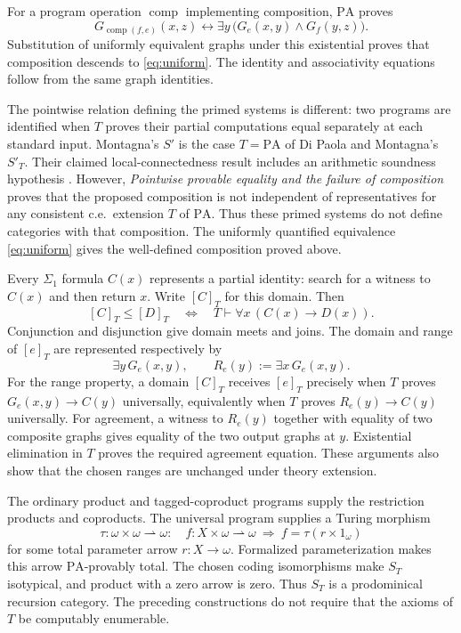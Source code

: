 \documentclass[11pt]{article}
\newcommand{\PA}{\mathrm{PA}}
\begin{document}
For a program operation $\operatorname{comp}$ implementing composition,
$\PA$ proves
\begin{equation}\label{eq:composition}
 G_{\operatorname{comp}(f,e)}(x,z)
 \leftrightarrow
 \exists y\,\bigl(G_e(x,y)\land G_f(y,z)\bigr).
\end{equation}
Substitution of uniformly equivalent graphs under this existential proves
that composition descends to \eqref{eq:uniform}. The identity and
associativity equations follow from the same graph identities.

The pointwise relation defining the primed systems is different:
two programs are identified when $T$ proves their partial computations
equal separately at each standard input. Montagna's $S'$ is the case
$T=\PA$ of Di Paola and Montagna's $S'_T$. Their claimed
local-connectedness result includes an arithmetic soundness hypothesis
\cite[Theorem 4.5, pp.~658--659]{DPM}. However,
\emph{Pointwise provable equality and the failure of composition}
\cite[Corollary 2]{Composition} proves that the proposed composition
is not independent of representatives for any consistent c.e.\
extension $T$ of $\PA$. Thus these primed systems do not define
categories with that composition. The uniformly quantified equivalence
\eqref{eq:uniform} gives the well-defined composition proved above.

Every $\Sigma_1$ formula $C(x)$ represents a partial identity: search for
a witness to $C(x)$ and then return $x$. Write $[C]_T$ for this domain.
Then
\begin{equation}\label{eq:domain-order}
 [C]_T\le[D]_T
 \quad\Longleftrightarrow\quad
 T\vdash\forall x\,(C(x)\longrightarrow D(x)).
\end{equation}
Conjunction and disjunction give domain meets and joins. The domain and
range of $[e]_T$ are represented respectively by
\[
 \exists y\,G_e(x,y),\qquad
 R_e(y):=\exists x\,G_e(x,y).
\]
For the range property, a domain $[C]_T$ receives $[e]_T$ precisely when
$T$ proves $G_e(x,y)\to C(y)$ universally, equivalently when
$T$ proves $R_e(y)\to C(y)$ universally. For agreement, a witness to
$R_e(y)$ together with equality of two composite graphs gives equality
of the two output graphs at $y$. Existential elimination in $T$ proves
the required agreement equation. These arguments also show that the
chosen ranges are unchanged under theory extension.

The ordinary product and tagged-coproduct programs supply the restriction
products and coproducts. The universal program supplies a Turing morphism
\[
 \tau:\omega\times\omega\rightharpoonup\omega:
 \quad f:X\times\omega\rightharpoonup\omega
 \ \Longrightarrow\ 
 f=\tau(r\times1_\omega)
\]
for some total parameter arrow $r:X\to\omega$. Formalized
parameterization makes this arrow $\PA$-provably total. The chosen coding
isomorphisms make $S_T$ isotypical, and product with a zero arrow is zero.
Thus $S_T$ is a prodominical recursion category. The preceding
constructions do not require that the axioms of $T$ be computably enumerable.
\end{document}
